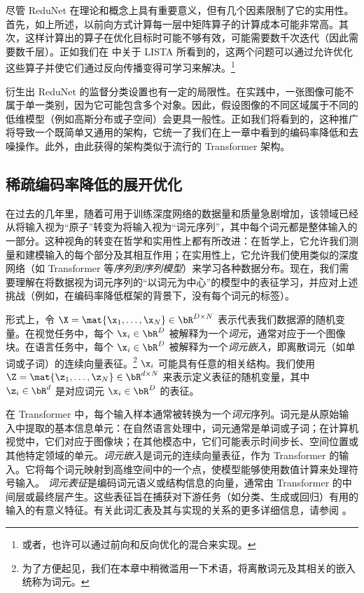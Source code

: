 \documentclass[../../book-main_zh.tex]{subfiles}
\begin{document}
尽管 ReduNet 在理论和概念上具有重要意义，但有几个因素限制了它的实用性。首先，如上所述，以前向方式计算每一层中矩阵算子的计算成本可能非常高。其次，这样计算出的算子在优化目标时可能不够有效，可能需要数千次迭代（因此需要数千层）。正如我们在  中关于 LISTA 所看到的，这两个问题可以通过允许优化这些算子并使它们通过反向传播变得可学习来解决。\footnote{或者，也许可以通过前向和反向优化的混合来实现。}

衍生出 ReduNet 的监督分类设置也有一定的局限性。在实践中，一张图像可能不属于单一类别，因为它可能包含多个对象。因此，假设图像的不同区域属于不同的低维模型（例如高斯分布或子空间）会更具一般性。正如我们将看到的，这种推广将导致一个既简单又通用的架构，它统一了我们在上一章中看到的编码率降低和去噪操作。此外，由此获得的架构类似于流行的 Transformer 架构。

\subsection{稀疏编码率降低的展开优化}

在过去的几年里，随着可用于训练深度网络的数据量和质量急剧增加，该领域已经从将输入视为“原子”转变为将输入视为“词元序列”，其中每个词元都是整体输入的一部分。这种视角的转变在哲学和实用性上都有所改进：在哲学上，它允许我们测量和建模输入的每个部分及其相互作用；在实用性上，它允许我们使用类似的深度网络（如 Transformer 等\textit{序列到序列模型}）来学习各种数据分布。现在，我们需要理解在将数据视为词元序列的“以词元为中心”的模型中的表征学习，并应对上述挑战（例如，在编码率降低框架的背景下，没有每个词元的标签）。

形式上，令 \(\X = \mat{\x_{1}, \dots, \x_{N}} \in \bR^{D \times N}\) 表示代表我们数据源的随机变量。在视觉任务中，每个 \(\x_{i} \in \bR^{D}\) 被解释为一个\textit{词元}，通常对应于一个图像块。在语言任务中，每个 \(\x_{i} \in \bR^{D}\) 被解释为一个\textit{词元嵌入}，即离散词元（如单词或子词）的连续向量表征。\footnote{为了方便起见，我们在本章中稍微滥用一下术语，将离散词元及其相关的嵌入统称为词元。}  %
\(\x_{i}\) 可能具有任意的相关结构。我们使用 \(\Z = \mat{\z_{1}, \dots, \z_{N}} \in \bR^{d \times N}\) 来表示定义表征的随机变量，其中 \(\z_{i} \in \bR^{d}\) 是对应词元 \(\x_i \in \bR^{D}\) 的表征。%

\begin{remark}
    在 Transformer 中，每个输入样本通常被转换为一个{\em 词元}序列。词元是从原始输入中提取的基本信息单元：在自然语言处理中，词元通常是单词或子词；在计算机视觉中，它们对应于图像块；在其他模态中，它们可能表示时间步长、空间位置或其他特定领域的单元。{\em 词元嵌入}是词元的连续向量表征，作为 Transformer 的输入。它将每个词元映射到高维空间中的一个点，使模型能够使用数值计算来处理符号输入。
    {\em 词元表征}是编码词元语义或结构信息的向量，通常由 Transformer 的中间层或最终层产生。这些表征旨在捕获对下游任务（如分类、生成或回归）有用的输入的有意义特征。有关此词汇表及其与实现的关系的更多详细信息，请参阅 。
\end{remark}
\end{document}
